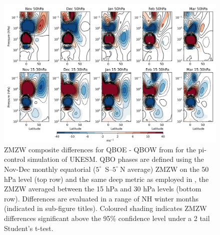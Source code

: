 \begin{figure}[h!]
\begin{center}
\noindent\includegraphics[width = \linewidth]{Figures/Figures-deepQBO/LAGGED_ZMZW_composites_by_month_QBO_phases_U_picontrol_MarQBO_vs_Mar_deephPa_5thresh.png}
\caption[ZMZW composites under QBO phases in the pi-control simulation]{ZMZW composite differences for QBOE - QBOW from for the pi-control simulation of UKESM. QBO phases are defined using the Nov-Dec monthly equatorial ($5^{\circ}$\ S--$5^{\circ}\ $N average) ZMZW on the 50 hPa level (top row) and the same deep metric as employed in \cite{andrewsObserved2019d}, the ZMZW averaged between the 15 hPa and 30 hPa levels (bottom row). Differences are evaluated in a range of NH winter months (indicated in sub-figure titles). Coloured shading indicates ZMZW differences significant above the 95\% confidence level under a 2 tail Student’s t-test.}
\label{fig:HT_picontrol}
\end{center}
\end{figure}

